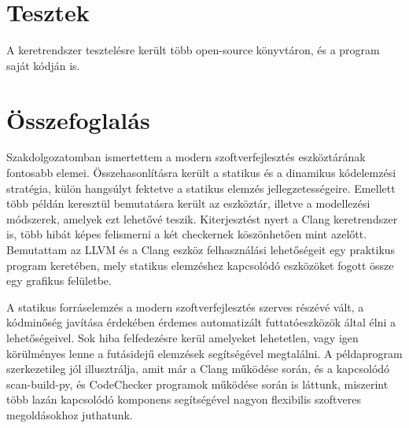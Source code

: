 \documentclass[a4paper,12pt]{report}
\begin{document}
\chapter{Tesztek}
A keretrendszer tesztelésre került több open-source könyvtáron, és a program saját kódján is.

\chapter{Összefoglalás}
Szakdolgozatomban ismertettem a modern szoftverfejlesztés eszköztárának fontosabb elemei. Összehasonlításra került a statikus és a dinamikus kódelemzési stratégia, külön hangsúlyt fektetve a statikus elemzés jellegzetességeire. Emellett több példán keresztül bemutatásra került az eszköztár, illetve a modellezési módszerek, amelyek ezt lehetővé teszik. Kiterjesztést nyert a Clang keretrendszer is, több hibát képes felismerni a két checkernek köszönhetően mint azelőtt. Bemutattam az LLVM és a Clang eszköz felhasználási lehetőségeit egy praktikus program keretében, mely statikus elemzéshez kapcsolódó eszközöket fogott össze egy grafikus felületbe.

A statikus forráselemzés a modern szoftverfejlesztés szerves részévé vált, a kódminőség javítása érdekében érdemes automatizált futtatóeszközök által élni a lehetőségeivel. Sok hiba felfedezésre kerül amelyeket lehetetlen, vagy igen körülményes lenne a futásidejű elemzések segítségével megtalálni. A példaprogram szerkezetileg jól illusztrálja, amit már a Clang működése során, és a kapcsolódó scan-build-py, és CodeChecker programok működése során is láttunk, miszerint több lazán kapcsolódó komponens segítségével nagyon flexibilis szoftveres megoldásokhoz juthatunk.
\end{document}
